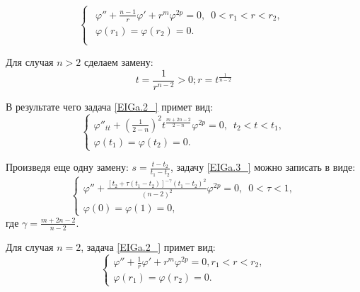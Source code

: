 \begin{equation}
\label{EIGa.2_}
\left\{\begin{array}{c} {\begin{array}{l} {\varphi ''+\frac{n-1}{r} \varphi '+r^{m} \varphi ^{2p} =0,\, \, \, 0<r_{1} <r<r_{2} ,} \\ {\varphi \left(r_{1} \right)=\varphi \left(r_{2} \right)=0.} \end{array}} \\ {} \end{array}\right.
\end{equation}

Для случая $n>2$ сделаем замену:
\begin{equation*}
t=\frac{1}{r^{n-2} } >0;   r=t^{\frac{1}{n-2} }
\end{equation*}

В результате чего задача \eqref{EIGa.2_} примет вид:
\begin{equation}
\label{EIGa.3_} \left\{\begin{array}{l} {\varphi ''_{tt} +\left(\frac{1}{2-n} \right)^{2} t^{\frac{m+2n-2}{2-n} } \varphi ^{2p} =0,\, \, \, t_{2} <t<t_{1} ,} \\ {\varphi \left(t_{1} \right)=\varphi \left(t_{2} \right)=0.} \end{array}\right.
\end{equation}

Произведя еще одну замену: $s=\frac{t-t_{2} }{t_{1} -t_{2} }$, задачу \eqref{EIGa.3_} можно записать в виде:
\begin{equation}
\label{EIGa.4_} \left\{\begin{array}{l} {\varphi ''+\frac{\left[t_{2} +\tau \left(t_{1} -t_{2} \right)\right]^{-\gamma } \left(t_{1} -t_{2} \right)^{2} }{\left(n-2\right)^{2} } \varphi ^{2p} =0,\, \, \, 0<\tau <1,} \\ {\varphi \left(0\right)=\varphi \left(1\right)=0,} \end{array}\right.
\end{equation}
где  $\gamma =\frac{m+2n-2}{n-2} $.

Для случая $n=2$, задача \eqref{EIGa.2_} примет вид:
\begin{equation}
\label{EIGa.5_} \left\{\begin{array}{l} {\varphi ''+\frac{1}{r} \varphi '+r^{m} \varphi ^{2p} =0,r_{1} <r<r_{2} ,} \\ {\varphi \left(r_{1} \right)=\varphi \left(r_{2} \right)=0.} \end{array}\right.
\end{equation}

